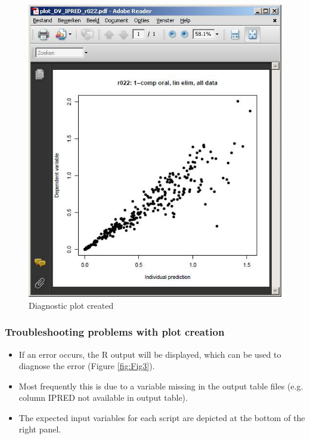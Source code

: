 \begin{figure}[h] \centering
    \includegraphics[scale=.45]{images/graphs_3.jpg}
    \caption{Diagnostic plot created\label{fig:Fig2}}
\end{figure}


\subsubsection*{Troubleshooting problems with plot creation}
\begin{itemize}
\item If an error occurs, the R output will be displayed, which can be
used to diagnose the error (Figure \ref{fig:Fig3}). 
\item Most frequently this is due to a variable missing in the output table 
files (e.g. column IPRED not available in output table).
\item The expected input variables for each script are depicted at the bottom of 
the right panel. 
\end{itemize}

